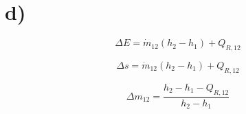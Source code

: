 

\section*{d)}

\[
\Delta E = \dot{m}_{12} (h_2 - h_1) + Q_{R,12}
\]

\[
\Delta s = \dot{m}_{12} (h_2 - h_1) + Q_{R,12}
\]

\[
\Delta m_{12} = \frac{h_2 - h_1 - Q_{R,12}}{h_2 - h_1}
\]